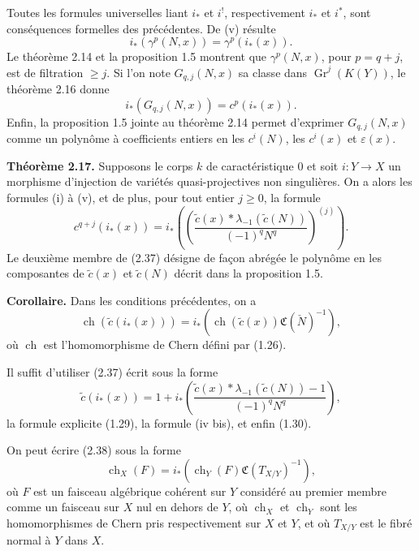 \documentclass[11pt]{article}
\newcommand{\Gr}{\operatorname{Gr}}
\newcommand{\ch}{\operatorname{ch}}
\providecommand{\ch}{\operatorname{ch}}
\providecommand{\Gr}{\operatorname{Gr}}
\providecommand{\Gr}{\operatorname{G}}
\begin{document}
Toutes les formules universelles liant $i_*$ et $i^!$, respectivement $i_*$ et $i^*$, sont conséquences formelles des précédentes. De (v) résulte
\[
 i_*(\gamma^p(N,x))=\gamma^p(i_*(x)).
\]
Le théorème 2.14 et la proposition 1.5 montrent que $\gamma^p(N,x)$, pour $p=q+j$, est de filtration $\geq j$. Si l'on note $G_{q,j}(N,x)$ sa classe dans $\Gr^j(K(Y))$, le théorème 2.16 donne
\[
 i_*(G_{q,j}(N,x))=c^p(i_*(x)).
\]
Enfin, la proposition 1.5 jointe au théorème 2.14 permet d'exprimer $G_{q,j}(N,x)$ comme un polynôme à coefficients entiers en les $c^i(N)$, les $c^i(x)$ et $\varepsilon(x)$.

\textbf{Théorème 2.17.} Supposons le corps $k$ de caractéristique $0$ et soit $i:Y\to X$ un morphisme d'injection de variétés quasi-projectives non singulières. On a alors les formules (i) à (v), et de plus, pour tout entier $j\geq0$, la formule
\begin{equation}\tag{2.37}
 c^{q+j}(i_*(x))=i_*\left(\left(\frac{\widetilde c(x)*\lambda_{-1}(\widetilde c(N))}{(-1)^qN^q}\right)^{(j)}\right).
\end{equation}
Le deuxième membre de (2.37) désigne de façon abrégée le polynôme en les composantes de $\widetilde c(x)$ et $\widetilde c(N)$ décrit dans la proposition 1.5.

\textbf{Corollaire.} Dans les conditions précédentes, on a
\begin{equation}\tag{2.38}
 \ch(\widetilde c(i_*(x)))=i_*\left(\ch(\widetilde c(x))\mathfrak C(\check N)^{-1}\right),
\end{equation}
où $\ch$ est l'homomorphisme de Chern défini par (1.26).

Il suffit d'utiliser (2.37) écrit sous la forme
\begin{equation}\tag{2.37 bis}
 \widetilde c(i_*(x))=1+i_*\left(\frac{\widetilde c(x)*\lambda_{-1}(\widetilde c(N))-1}{(-1)^qN^q}\right),
\end{equation}
la formule explicite (1.29), la formule (iv bis), et enfin (1.30).

On peut écrire (2.38) sous la forme
\begin{equation}\tag{2.38 bis}
 \ch_X(F)=i_*\left(\ch_Y(F)\mathfrak C(T_{X/Y})^{-1}\right),
\end{equation}
où $F$ est un faisceau algébrique cohérent sur $Y$ considéré au premier membre comme un faisceau sur $X$ nul en dehors de $Y$, où $\ch_X$ et $\ch_Y$ sont les homomorphismes de Chern pris respectivement sur $X$ et $Y$, et où $T_{X/Y}$ est le fibré normal à $Y$ dans $X$.
\end{document}
